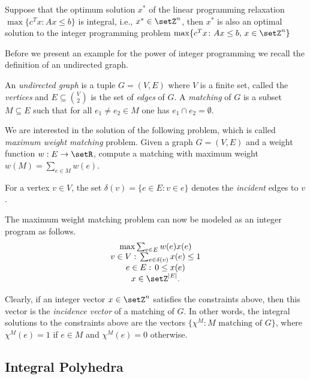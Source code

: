 \begin{theorem}
  \label{thr:14}
  Suppose that the optimum solution $x^*$ of the linear programming
  relaxation $\max\{c^Tx \colon Ax\leq b\}$  is integral, i.e., $x^* \in
  \setZ^n$, then $x^*$ is also an optimal solution to the integer
  programming problem $\max\{c^Tx \colon Ax\leq b, \, x \in \setZ^n\}$
\end{theorem}

Before we present an example for the power of integer programming we
recall the definition of an undirected graph. 

\begin{definition} 
  An \emph{undirected graph} is a tuple $G = (V,E)$ where $V$ is a
  finite set, called the \emph{vertices} and $E\subseteq\binom{V}{2}$ is the
  set of \emph{edges} of $G$.  A \emph{matching} of $G$ is a subset
  $M\subseteq E$ such that for all $e_1\neq e_2\in M$ one has $e_1\cap e_2 = \emptyset$. 
\end{definition}


We are interested in the solution of the following problem, which is
called \emph{maximum weight matching} problem. Given a graph $G =
(V,E)$ and a weight function $w:E\to\setR$, compute a matching with
maximum weight $w(M) = \sum_{e \in M} w(e)$. 

For a vertex $v \in V$, the set $\delta(v) = \{e \in E \colon v \in e\}$ denotes
the \emph{incident} edges to $v$. 

The maximum weight matching problem  can now be modeled as an integer
program as follows. 
\begin{displaymath}
  \begin{array}{c}
    \max \sum_{e \in E} w(e) x(e) \\
    v \in V: \, \sum_{e \in \delta(v)} x(e)\leq1 \\
    e \in E:\, 0\leq x(e) \\
    x \in \setZ^{|E|}.
  \end{array}
\end{displaymath}

Clearly, if an integer vector $x \in \setZ^n$ satisfies the constraints
above, then this vector is the \emph{incidence vector}  of a matching of
$G$. In other words, the integral solutions to the constraints above
are the vectors $\{\chi^M \colon M \text{ matching of }G\}$, where $\chi^M(e)
= 1$ if $e \in M$ and $\chi^M(e)=0$ otherwise. 

  
\subsection{Integral Polyhedra}



